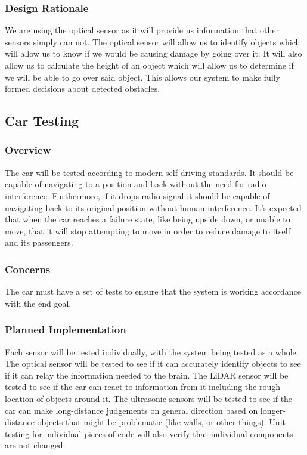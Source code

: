 \documentclass[onecolumn, draftclsnofoot, 10pt, compsoc]{IEEEtran}
\begin{document}
\subsubsection{Design Rationale}
We are using the optical sensor as it will provide us information that other sensors simply can not. The optical sensor will allow us to identify objects which will allow us to know if we would be causing damage by going over it. It will also allow us to calculate the height of an object which will allow us to determine if we will be able to go over said object. This allows our system to make fully formed decisions about detected obstacles. 


\subsection{Car Testing}

\subsubsection{Overview}

The car will be tested according to modern self-driving standards. It should be capable of navigating to a position and back without the need for radio interference. Furthermore, if it drops radio signal it should be capable of navigating back to its original position without human interference. It's expected that when the car reaches a failure state, like being upside down, or unable to move, that it will stop attempting to move in order to reduce damage to itself and its passengers.

\subsubsection{Concerns}
The car must have a set of tests to ensure that the system is working accordance with the end goal.

\subsubsection{Planned Implementation}

Each sensor will be tested individually, with the system being tested as a whole. The optical sensor will be tested to see if it can accurately identify objects to see if it can relay the information needed to the brain. The LiDAR sensor will be tested to see if the car can react to information from it including the rough location of objects around it. The ultrasonic sensors will be tested to see if the car can make long-distance judgements on general direction based on longer-distance objects that might be problematic (like walls, or other things). Unit testing for individual pieces of code will also verify that individual components are not changed. 
\end{document}
